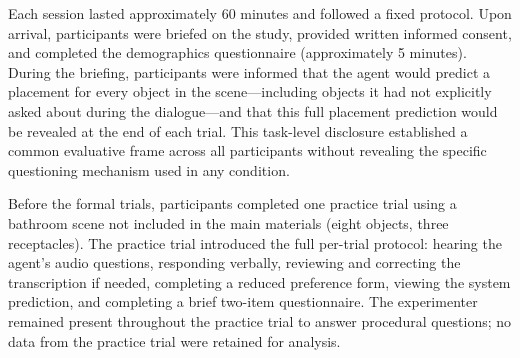 \documentclass[manuscript,review,anonymous]{acmart}
\begin{document}
Each session lasted approximately 60 minutes and followed a fixed protocol. Upon arrival, participants were briefed on the study, provided written informed consent, and completed the demographics questionnaire (approximately 5 minutes). During the briefing, participants were informed that the agent would predict a placement for every object in the scene---including objects it had not explicitly asked about during the dialogue---and that this full placement prediction would be revealed at the end of each trial. This task-level disclosure established a common evaluative frame across all participants without revealing the specific questioning mechanism used in any condition.

Before the formal trials, participants completed one practice trial using a bathroom scene not included in the main materials (eight objects, three receptacles). The practice trial introduced the full per-trial protocol: hearing the agent's audio questions, responding verbally, reviewing and correcting the transcription if needed, completing a reduced preference form, viewing the system prediction, and completing a brief two-item questionnaire. The experimenter remained present throughout the practice trial to answer procedural questions; no data from the practice trial were retained for analysis.
\end{document}
